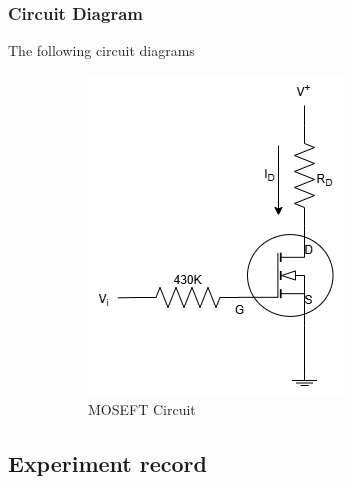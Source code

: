    \subsubsection{Circuit Diagram}
        The following circuit diagrams 
        \begin{figure}[H]
            \centering
            \begin{subfigure}{0.5\textwidth}
                \includegraphics[width=1\linewidth]{Experiment_08/Circuit/Lab8.drawio.png}
                \caption{MOSEFT Circuit}
                \label{cir:8}
            \end{subfigure}
            \caption{}
        \end{figure}


\subsection{Experiment record}
